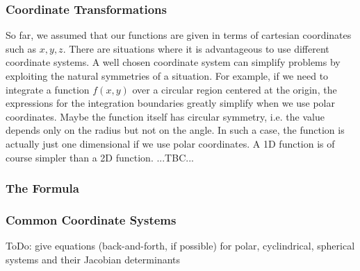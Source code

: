 \subsubsection{Coordinate Transformations}
So far, we assumed that our functions are given in terms of cartesian coordinates such as $x,y,z$. There are situations where it is advantageous to use different coordinate systems. A well chosen coordinate system can simplify problems by exploiting the natural symmetries of a situation. For example, if we need to integrate a function $f(x,y)$ over a circular region centered at the origin, the expressions for the integration boundaries greatly simplify when we use polar coordinates. Maybe the function itself has circular symmetry, i.e. the value depends only on the radius but not on the angle. In such a case, the function is actually just one dimensional if we use polar coordinates. A 1D function is of course simpler than a 2D function. 
...TBC...

\subsubsection{The Formula}

\subsubsection{Common Coordinate Systems}
ToDo: give equations (back-and-forth, if possible) for polar, cyclindrical, spherical systems and their Jacobian determinants








\begin{comment}

-Multiple integrals:
-double integrals over:
 -axis-parallel rectangles (simplest case, limits are constants)
 -triangles with two points with same y-coordinate -> y(x) is a linear function
  -can also be done using x(y) - whatever is most convenient
 -general triangles (split into two triangles of the sort above)
 -general polygons (via triangulation)
 -segments of circular annulus -> uses a coordinate transformation to polar coordinates
  -generalization to arbitrary coordinates
-triple integrals over
 -axis parallel cuboids
 -3-simplex (tetrahedron)
 -general polyeders
 -using cyclindrical, spherical and general 3D coordinates
-nD integrals
 
-line integrals (of scalar function),
-line integrals of vector fields (circulation), surface integrals (flux)
-coordinate transformations (polar, cylindricial, spherical, etc. -> jacobian determinant)
 

They don't teach this in MULTIVARIABLE CALCULUS
https://www.youtube.com/watch?v=Z7YPImc7ElE


\end{comment} 